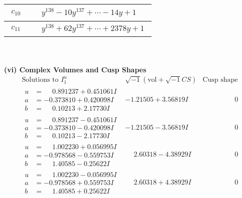 \documentclass[1p]{elsarticle_modified}
\theoremstyle{definition}
\newcommand{\I}{\sqrt{-1}}
\begin{document}
\begin{tabular}{m{50pt}|m{274pt}}
\hline $$\begin{aligned}c_{10}\end{aligned}$$&$\begin{aligned}
&y^{138}-10 y^{137}+\cdots-14 y+1
\end{aligned}$\\
\hline $$\begin{aligned}c_{11}\end{aligned}$$&$\begin{aligned}
&y^{138}+62 y^{137}+\cdots+2378 y+1
\end{aligned}$\\
\hline
\end{tabular}\\~\\
\newpage\flushleft \textbf{(vi) Complex Volumes and Cusp Shapes}
$$\begin{array}{c|c|c}  
\text{Solutions to }I^u_{1}& \I (\text{vol} + \sqrt{-1}CS) & \text{Cusp shape}\\
 \hline 
\begin{aligned}
u &= \phantom{-}0.891237 + 0.451061 I \\
a &= -0.373810 + 0.420098 I \\
b &= \phantom{-}0.10213 + 2.17730 I\end{aligned}
 & -1.21505 + 3.56819 I & \phantom{-0.000000 } 0 \\ \hline\begin{aligned}
u &= \phantom{-}0.891237 - 0.451061 I \\
a &= -0.373810 - 0.420098 I \\
b &= \phantom{-}0.10213 - 2.17730 I\end{aligned}
 & -1.21505 - 3.56819 I & \phantom{-0.000000 } 0 \\ \hline\begin{aligned}
u &= \phantom{-}1.002230 + 0.056995 I \\
a &= -0.978568 - 0.559753 I \\
b &= \phantom{-}1.40585 - 0.25622 I\end{aligned}
 & \phantom{-}2.60318 - 4.38929 I & \phantom{-0.000000 } 0 \\ \hline\begin{aligned}
u &= \phantom{-}1.002230 - 0.056995 I \\
a &= -0.978568 + 0.559753 I \\
b &= \phantom{-}1.40585 + 0.25622 I\end{aligned}
 & \phantom{-}2.60318 + 4.38929 I & \phantom{-0.000000 } 0 \\ \hline\begin{aligned}

\end{aligned}
\end{array}$$
\end{document}

